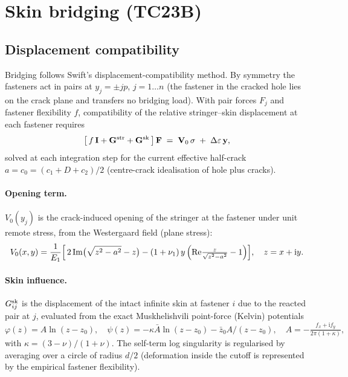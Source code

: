 \documentclass[11pt]{article}
\begin{document}
\section{Skin bridging (TC23B)}

\subsection{Displacement compatibility}

Bridging follows Swift's displacement-compatibility method. By symmetry the
fasteners act in pairs at $y_j=\pm jp$, $j=1\ldots n$ (the fastener in the
cracked hole lies on the crack plane and transfers no bridging load). With
pair forces $F_j$ and fastener flexibility $f$, compatibility of the
relative stringer--skin displacement at each fastener requires
\begin{equation}
  \bigl[\,f\,\mathbf{I} + \mathbf{G}^{\rm str} + \mathbf{G}^{\rm sk}\,\bigr]\,
  \mathbf{F} \;=\; \mathbf{V}_0\,\sigma \;+\; \Delta\varepsilon\,\mathbf{y},
  \label{eq:compat}
\end{equation}
solved at each integration step for the current effective half-crack
$a=c_0=(c_1+D+c_2)/2$ (centre-crack idealisation of hole plus cracks).

\paragraph{Opening term.} $V_0(y_j)$ is the crack-induced opening of the
stringer at the fastener under unit remote stress, from the Westergaard
field (plane stress):
\begin{equation}
  V_0(x,y)=\frac1{E_1}\Bigl[\,2\,\mathrm{Im}\bigl(\sqrt{z^2-a^2}-z\bigr)
  -(1+\nu_1)\,y\,\Bigl(\mathrm{Re}\tfrac{z}{\sqrt{z^2-a^2}}-1\Bigr)\Bigr],
  \quad z=x+\mathrm{i}y .
\end{equation}

\paragraph{Skin influence.} $G^{\rm sk}_{ij}$ is the displacement of the
intact infinite skin at fastener $i$ due to the reacted pair at $j$,
evaluated from the exact Muskhelishvili point-force (Kelvin) potentials
\begin{equation}
  \varphi(z)=A\ln(z-z_0),\quad
  \psi(z)=-\kappa\bar A\ln(z-z_0)-\bar z_0 A/(z-z_0),\quad
  A=-\tfrac{f_x+\mathrm{i}f_y}{2\pi(1+\kappa)},
\end{equation}
with $\kappa=(3-\nu)/(1+\nu)$. The self-term log singularity is regularised
by averaging over a circle of radius $d/2$ (deformation inside the cutoff is
represented by the empirical fastener flexibility).
\end{document}

